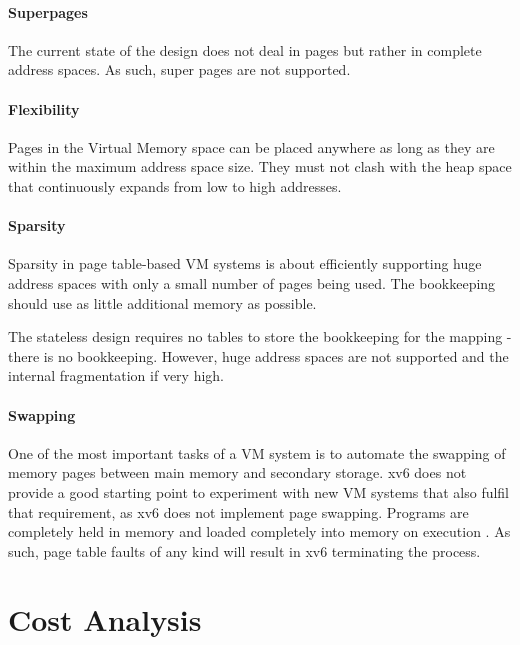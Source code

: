 \paragraph{Superpages} The current state of the design does not deal in pages but rather in complete address spaces. As such, super pages are not supported.

\paragraph{Flexibility} Pages in the Virtual Memory space can be placed anywhere as long as they are within the maximum address space size. They must not clash with the heap space that continuously expands from low to high addresses.

\paragraph{Sparsity} Sparsity in page table-based VM systems is about efficiently
supporting huge address spaces with only a small number of pages being used. The bookkeeping should use as little additional memory as possible.

The stateless design requires no tables to store the bookkeeping for the mapping - there is no bookkeeping. However, huge address spaces are not supported and the internal fragmentation if very high.

\paragraph{Swapping} One of the most important tasks of a VM system is to automate the swapping of memory pages between main memory and secondary storage. xv6 does not provide a good starting point to experiment with new VM systems that also fulfil that requirement, as xv6 does not implement page swapping. Programs are completely held in memory and loaded completely into memory on execution \cite{cox2011xv6}. As such, page table faults of any kind will result in xv6 terminating the process.



\section{Cost Analysis}

